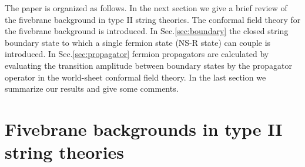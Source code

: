 \documentclass[a4paper,prd,preprint]{revtex4}
\begin{document}
The paper is organized as follows.
In the next section
 we give a brief review of the fivebrane background
 in type II string theories.
The conformal field theory for the fivebrane background is introduced.
In Sec.\ref{sec:boundary}
 the closed string boundary state
 to which a single fermion state (NS-R state) can couple is introduced.
In Sec.\ref{sec:propagator}
 fermion propagators are calculated by evaluating
 the transition amplitude between boundary states
 by the propagator operator in the world-sheet conformal field theory.
In the last section
 we summarize our results and give some comments.

\section{Fivebrane backgrounds in type II string theories}
\label{sec:CFT}
\end{document}
